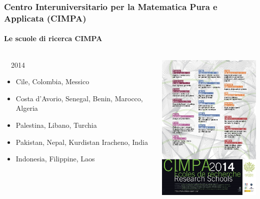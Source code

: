 \documentclass[10pt,final]{beamer} %
\begin{document}
\begin{frame}
\frametitle{Centro Interuniversitario per la Matematica Pura e Applicata (CIMPA)}
\framesubtitle{Le scuole di ricerca CIMPA}

\begin{columns}[c]
\begin{column}{4.5cm}

\large{\ \ 2014}
\begin{itemize}
 \item Cile, Colombia, Messico
\item Costa d'Avorio, Senegal, Benin, Marocco,
Algeria
\item Palestina, Libano, Turchia
\item Pakistan, Nepal, Kurdistan Iracheno, India
\item Indonesia, Filippine, Laos
\end{itemize}
\end{column}
\begin{column}{5.5cm}
\includegraphics[width=5.5cm]{Poster2014-3.jpg}
\end{column}
\end{columns}
\end{frame}
\end{document}
